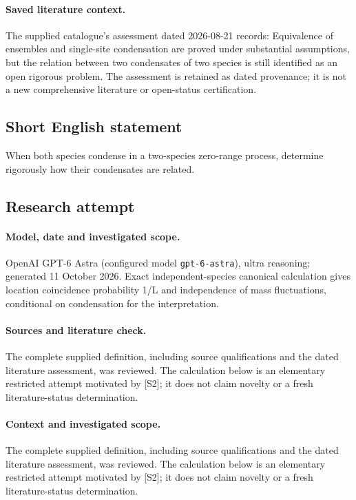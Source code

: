 \documentclass[11pt]{article}
\begin{document}
\paragraph{Saved literature context.} The supplied catalogue's assessment dated 2026-08-21 records: Equivalence of ensembles and single-site condensation are proved under substantial assumptions, but the relation between two condensates of two species is still identified as an open rigorous problem. The assessment is retained as dated provenance; it is not a new comprehensive literature or open-status certification.
\subsection{Short English statement}
When both species condense in a two-species zero-range process, determine rigorously how their condensates are related.
\subsection{Research attempt}
\paragraph{Model, date and investigated scope.}
OpenAI GPT-6 Astra (configured model \texttt{gpt-6-astra}), ultra reasoning; generated 11 October 2026. Exact independent-species canonical calculation gives location coincidence probability 1/L and independence of mass fluctuations, conditional on condensation for the interpretation.

\paragraph{Sources and literature check.}
The complete supplied definition, including source qualifications and the dated literature assessment, was reviewed. The calculation below is an elementary restricted attempt motivated by [S2]; it does not claim novelty or a fresh literature-status determination.

\paragraph{Context and investigated scope.} The complete supplied definition, including source qualifications and the dated literature assessment, was reviewed. The calculation below is an elementary restricted attempt motivated by [S2]; it does not claim novelty or a fresh literature-status determination.
\end{document}
